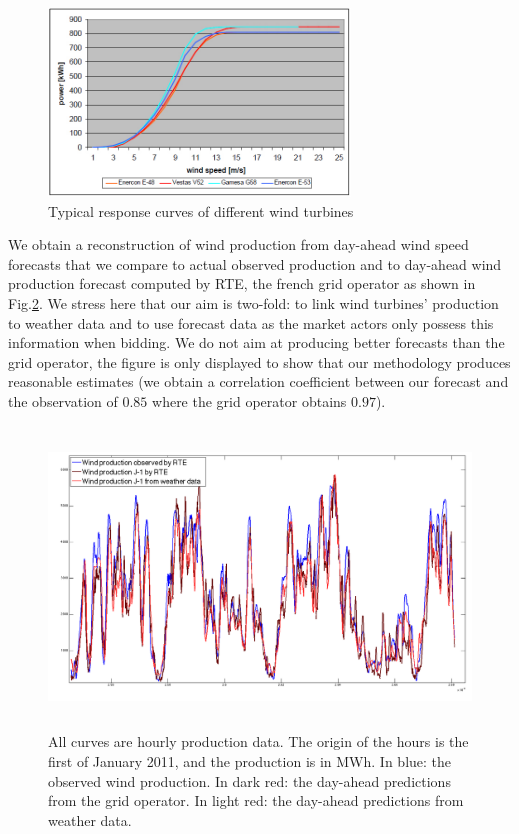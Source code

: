 \begin{figure}[!ht]
\begin{center} \includegraphics[height=50mm]{forqgis/ref-powercurve.png}
\end{center}
\caption{\small Typical response curves of different wind turbines}
\label{fig:typpowercurve}
\end{figure}


We obtain a reconstruction of wind production from day-ahead wind speed forecasts that we compare to actual observed production and to day-ahead wind production forecast computed by RTE, the french grid operator as shown in Fig.\ref{fig:windreco1DA}. We stress here that our aim is two-fold: to link wind turbines' production to weather data and to use forecast data as the market actors only possess this information when bidding. We do not aim at producing better forecasts than the grid operator, the figure is only displayed to show that our methodology produces reasonable estimates (we obtain a correlation coefficient between our forecast and the observation of $0.85$ where the grid operator obtains $0.97$).  

\begin{figure}[!ht]
\begin{center} \includegraphics[height=80mm]{forqgis/windprodD1A.png}
\end{center}
\caption{\small All curves are hourly production data. The origin of the hours is the first of January 2011, and the production is in MWh. In blue: the observed wind production. In dark red: the day-ahead predictions from the grid operator. In light red: the day-ahead predictions from weather data.}
\label{fig:windreco1DA}
\end{figure}



